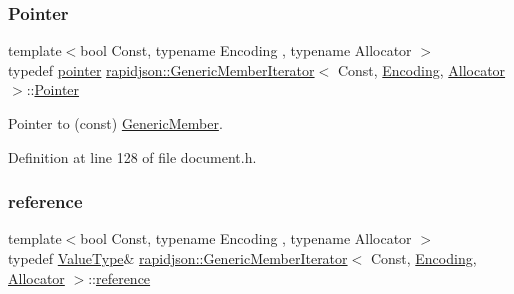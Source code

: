 \mbox{\label{classrapidjson_1_1_generic_member_iterator_aa9d53504374c7c6bdf46775482c5b107}} 
\subsubsection{\texorpdfstring{Pointer}{Pointer}}
{\footnotesize\ttfamily template$<$bool Const, typename Encoding , typename Allocator $>$ \\
typedef \mbox{\hyperlink{classrapidjson_1_1_generic_member_iterator_a72c5c50dc9df5622b0be822dad59e372}{pointer}} \mbox{\hyperlink{classrapidjson_1_1_generic_member_iterator}{rapidjson\+::\+Generic\+Member\+Iterator}}$<$ Const, \mbox{\hyperlink{classrapidjson_1_1_encoding}{Encoding}}, \mbox{\hyperlink{classrapidjson_1_1_allocator}{Allocator}} $>$\+::\mbox{\hyperlink{classrapidjson_1_1_generic_member_iterator_aa9d53504374c7c6bdf46775482c5b107}{Pointer}}}



Pointer to (const) \mbox{\hyperlink{structrapidjson_1_1_generic_member}{Generic\+Member}}. 



Definition at line 128 of file document.\+h.

\mbox{\label{classrapidjson_1_1_generic_member_iterator_ab7d2d79f74f084b9b5abd42ef891536d}} 
\subsubsection{\texorpdfstring{reference}{reference}}
{\footnotesize\ttfamily template$<$bool Const, typename Encoding , typename Allocator $>$ \\
typedef \mbox{\hyperlink{classrapidjson_1_1_generic_member_iterator_ad2b02bbaddb3cc35db1d6a70d7850481}{Value\+Type}}\& \mbox{\hyperlink{classrapidjson_1_1_generic_member_iterator}{rapidjson\+::\+Generic\+Member\+Iterator}}$<$ Const, \mbox{\hyperlink{classrapidjson_1_1_encoding}{Encoding}}, \mbox{\hyperlink{classrapidjson_1_1_allocator}{Allocator}} $>$\+::\mbox{\hyperlink{classrapidjson_1_1_generic_member_iterator_ab7d2d79f74f084b9b5abd42ef891536d}{reference}}}



